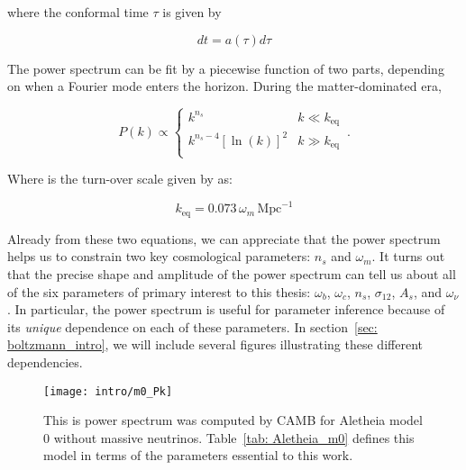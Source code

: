 where the conformal time $\tau$ is given by

\begin{equation}
dt = a(\tau) d \tau
\end{equation}

The power spectrum can be fit by a piecewise function of 
two parts, depending on when a Fourier mode enters the horizon.
During the matter-dominated era, 

\begin{equation}
\label{eq: n_s}
P(k) \propto 
\begin{cases}
      k^{n_s} & k \ll k_\text{eq} \\
      k^{n_s - 4} [\ln (k)]^2 & k \gg k_\text{eq} \\ 
    \end{cases}\,.
\end{equation}

Where is the turn-over scale given by \citet{FECS} as:

\begin{equation}
\label{eq: turnover}
k_\text{eq} = 0.073 \, \omega_m \, \mathrm{Mpc}^{-1}
\end{equation}


Already from these two equations, we can
appreciate that the power spectrum helps us to constrain two key cosmological
parameters: $n_s$ and $\omega_m$. It turns out that the precise shape and
amplitude of the power spectrum can tell us about all of the six
parameters of primary interest to this thesis:
$\omega_b$, $\omega_c$, $n_s$, $\sigma_{12}$, $A_s$, and $\omega_\nu$. 
In particular, the power spectrum is useful for parameter inference because of
its \textit{unique} dependence on each of these parameters. In 
section~\ref{sec: boltzmann_intro}, we will include several figures 
illustrating these different dependencies.


\begin{figure}[htb]
  \centering
  \texttt{[image: intro/m0\_Pk]}
  \caption[Aletheia Model 0 Power Spectrum]{This is power spectrum was
  computed by CAMB for Aletheia model 0 without massive neutrinos.
  Table~\ref{tab: Aletheia_m0} defines this model in terms
  of the parameters essential to this work.}
  \label{fig: first_power_spectrum}
\end{figure}


